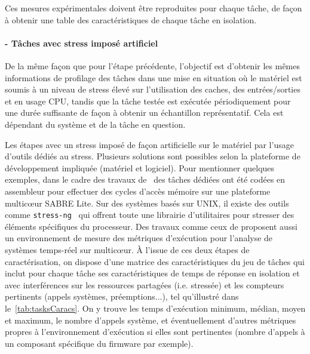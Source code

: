 \documentclass[french, a4paper, 11pt, twoside, pdftex]{StyleThese}
\begin{document}
			Ces mesures expérimentales doivent être reproduites pour chaque tâche, de façon à obtenir une table des caractéristiques de chaque tâche en isolation.
                    
    	\paragraph{ - Tâches avec stress imposé artificiel}
    		
    		De la même façon que pour l'étape précédente, l'objectif est d'obtenir les mêmes informations de profilage des tâches dans une mise en situation où le matériel est soumis à un niveau de stress élevé sur l'utilisation des caches, des entrées/sorties et en usage CPU, tandis que la tâche testée est exécutée périodiquement pour une durée suffisante de façon à obtenir un échantillon représentatif. Cela est dépendant du système et de la tâche en question.
    		
    		Les étapes avec un stress imposé de façon artificielle sur le matériel par l'usage d'outils dédiés au stress. Plusieurs solutions sont possibles selon la plateforme de développement impliquée (matériel et logiciel). Pour mentionner quelques exemples, dans le cadre des travaux de~\cite{blin_maximizing_2016} des tâches dédiées ont été codées en assembleur pour effectuer des cycles d'accès mémoire sur une plateforme multicœur SABRE Lite. Sur des systèmes basés sur UNIX, il existe des outils comme \texttt{stress-ng}~\cite{king_stress-ng_2019} qui offrent toute une librairie d'utilitaires pour stresser des éléments spécifiques du processeur. Des travaux comme ceux de \cite{girbal_metrics_2018} proposent aussi un environnement de mesure des métriques d'exécution pour l'analyse de systèmes temps-réel sur multicœur.  
	    	À l'issue de ces deux étapes de caractérisation, on dispose d'une matrice des caractéristiques du jeu de tâches qui inclut pour chaque tâche ses caractéristiques de temps de réponse en isolation et avec interférences sur les ressources partagées (i.e. stressée) et les compteurs pertinents (appels systèmes, préemptions...), tel qu'illustré dans le~\autoref{tab:tasksCaracs}. On y trouve les temps d'exécution minimum, médian, moyen et maximum, le nombre d'appels système, et éventuellement d'autres métriques propres à l'environnement d'exécution si elles sont pertinentes (nombre d'appels à un composant spécifique du firmware par exemple). 
	    	    	
\end{document}
